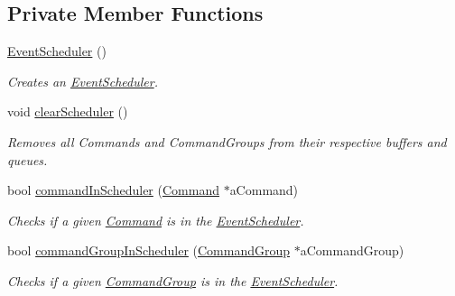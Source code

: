 \subsection*{Private Member Functions}
\begin{DoxyCompactItemize}
\item 
\mbox{\hyperlink{classlib_iterative_robot_1_1_event_scheduler_a5d0af0bdbbb5948ab06075ef12fc8aa0}{Event\+Scheduler}} ()
\begin{DoxyCompactList}\small\item\em Creates an \mbox{\hyperlink{classlib_iterative_robot_1_1_event_scheduler}{Event\+Scheduler}}. \end{DoxyCompactList}\item 
\mbox{\label{classlib_iterative_robot_1_1_event_scheduler_a92692ad8573d974bae62c62fccf808c4}} 
void \mbox{\hyperlink{classlib_iterative_robot_1_1_event_scheduler_a92692ad8573d974bae62c62fccf808c4}{clear\+Scheduler}} ()
\begin{DoxyCompactList}\small\item\em Removes all Commands and Command\+Groups from their respective buffers and queues. \end{DoxyCompactList}\item 
bool \mbox{\hyperlink{classlib_iterative_robot_1_1_event_scheduler_acc46d20d5b6e1b6d308bf64dd12ea791}{command\+In\+Scheduler}} (\mbox{\hyperlink{classlib_iterative_robot_1_1_command}{Command}} $\ast$a\+Command)
\begin{DoxyCompactList}\small\item\em Checks if a given \mbox{\hyperlink{classlib_iterative_robot_1_1_command}{Command}} is in the \mbox{\hyperlink{classlib_iterative_robot_1_1_event_scheduler}{Event\+Scheduler}}. \end{DoxyCompactList}\item 
bool \mbox{\hyperlink{classlib_iterative_robot_1_1_event_scheduler_af47242d40b09df43698bb00cbe4f9300}{command\+Group\+In\+Scheduler}} (\mbox{\hyperlink{classlib_iterative_robot_1_1_command_group}{Command\+Group}} $\ast$a\+Command\+Group)
\begin{DoxyCompactList}\small\item\em Checks if a given \mbox{\hyperlink{classlib_iterative_robot_1_1_command_group}{Command\+Group}} is in the \mbox{\hyperlink{classlib_iterative_robot_1_1_event_scheduler}{Event\+Scheduler}}. \end{DoxyCompactList}\item 

\end{DoxyCompactItemize}
